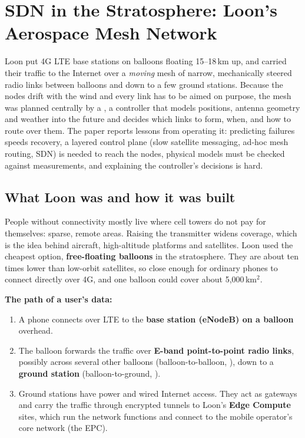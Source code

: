 \chapter{SDN in the Stratosphere: Loon's Aerospace Mesh Network}

\begin{keybox}
Loon put 4G LTE base stations on balloons floating 15--18\,km up, and carried their traffic to the Internet over a \emph{moving} mesh of narrow,
mechanically steered radio links between balloons and down to a few ground stations. Because the nodes drift with the wind and every link has to be aimed
on purpose, the mesh was planned centrally by a , a controller that models positions, antenna geometry and weather into the
future and decides which links to form, when, and how to route over them. The paper reports lessons from operating it: predicting failures speeds
recovery, a layered control plane (slow satellite messaging, ad-hoc mesh routing, SDN) is needed to reach the nodes, physical models must be checked against
measurements, and explaining the controller's decisions is hard.
\end{keybox}

\section{What Loon was and how it was built}

People without connectivity mostly live where cell towers do not pay for themselves: sparse, remote areas. Raising the transmitter widens coverage, which is the
idea behind aircraft, high-altitude platforms and satellites. Loon used the cheapest option, \textbf{free-floating balloons} in the stratosphere. They are about
ten times lower than low-orbit satellites, so close enough for ordinary phones to connect directly over 4G, and one balloon could cover about 5,000\,km$^2$.


\textbf{The path of a user's data:}
\begin{enumerate}
  \item A phone connects over LTE to the \textbf{base station (eNodeB) on a balloon} overhead.
  \item The balloon forwards the traffic over \textbf{E-band point-to-point radio links}, possibly across several other balloons (balloon-to-balloon, ), down to a
        \textbf{ground station} (balloon-to-ground, ).
  \item Ground stations have power and wired Internet access. They act as gateways and carry the traffic through encrypted tunnels to Loon's \textbf{Edge Compute} sites,
        which run the network functions and connect to the mobile operator's core network (the EPC).
\end{enumerate}

